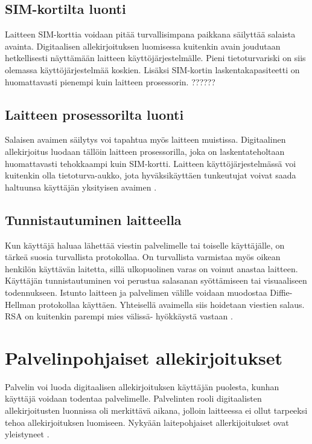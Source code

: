 \documentclass[finnish]{tktltiki2}
\theoremstyle{definition}
\theoremstyle{remark}
\begin{document}
\subsection{SIM-kortilta luonti}

Laitteen SIM-korttia voidaan pitää turvallisimpana paikkana säilyttää salaista avainta. Digitaalisen allekirjoituksen luomisessa kuitenkin avain joudutaan hetkellisesti näyttämään laitteen käyttöjärjestelmälle. Pieni tietoturvariski on siis olemassa käyttöjärjestelmää koskien. Lisäksi SIM-kortin laskentakapasiteetti on huomattavasti pienempi kuin laitteen prosessorin. ?????? 

\subsection{Laitteen prosessorilta luonti}

Salaisen avaimen säilytys voi tapahtua myös laitteen muistissa. Digitaalinen allekirjoitus luodaan tällöin laitteen prosessorilla, joka on laskentateholtaan huomattavasti tehokkaampi kuin SIM-kortti. Laitteen käyttöjärjestelmässä voi kuitenkin olla tietoturva-aukko, jota hyväksikäyttäen tunkeutujat voivat saada haltuunsa käyttäjän yksityisen avaimen \cite{proxy}.

\subsection{Tunnistautuminen laitteella}
Kun käyttäjä haluaa lähettää viestin palvelimelle tai toiselle käyttäjälle, on tärkeä suosia turvallista protokollaa. On turvallista varmistaa myös oikean henkilön käyttävän laitetta, sillä ulkopuolinen varas on voinut anastaa laitteen. Käyttäjän tunnistautuminen voi perustua salasanan syöttämiseen tai visuaaliseen todennukseen. Istunto laitteen ja palvelimen välille voidaan muodostaa Diffie-Hellman protokollaa käyttäen. Yhteisellä avaimella siis hoidetaan viestien salaus. RSA on kuitenkin parempi mies välissä- hyökkäystä vastaan \cite{enti}.

\section{Palvelinpohjaiset allekirjoitukset}

Palvelin voi luoda digitaalisen allekirjoituksen käyttäjän puolesta, kunhan käyttäjä voidaan todentaa palvelimelle. Palvelinten rooli digitaalisten allekirjoitusten luonnissa oli merkittävä aikana, jolloin laitteessa ei ollut tarpeeksi tehoa 
allekirjoituksen luomiseen. Nykyään laitepohjaiset allerkijoitukset ovat yleistyneet \cite{proxy}.
\end{document}
